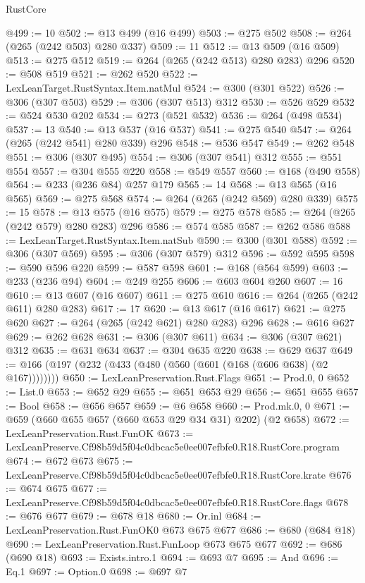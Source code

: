 \begin{lexlean}{RustCore}
\begin{coremodule}
@499 := 10
@502 := @13 @499 (@16 @499)
@503 := @275 @502
@508 := @264 (@265 (@242 @503) @280 @337)
@509 := 11
@512 := @13 @509 (@16 @509)
@513 := @275 @512
@519 := @264 (@265 (@242 @513) @280 @283) @296
@520 := @508 @519
@521 := @262 @520
@522 := LexLeanTarget.RustSyntax.Item.natMul
@524 := @300 (@301 @522)
@526 := @306 (@307 @503)
@529 := @306 (@307 @513) @312
@530 := @526 @529
@532 := @524 @530 @202
@534 := @273 (@521 @532)
@536 := @264 (@498 @534)
@537 := 13
@540 := @13 @537 (@16 @537)
@541 := @275 @540
@547 := @264 (@265 (@242 @541) @280 @339) @296
@548 := @536 @547
@549 := @262 @548
@551 := @306 (@307 @495)
@554 := @306 (@307 @541) @312
@555 := @551 @554
@557 := @304 @555 @220
@558 := @549 @557
@560 := @168 (@490 @558)
@564 := @233 (@236 @84) @257 @179
@565 := 14
@568 := @13 @565 (@16 @565)
@569 := @275 @568
@574 := @264 (@265 (@242 @569) @280 @339)
@575 := 15
@578 := @13 @575 (@16 @575)
@579 := @275 @578
@585 := @264 (@265 (@242 @579) @280 @283) @296
@586 := @574 @585
@587 := @262 @586
@588 := LexLeanTarget.RustSyntax.Item.natSub
@590 := @300 (@301 @588)
@592 := @306 (@307 @569)
@595 := @306 (@307 @579) @312
@596 := @592 @595
@598 := @590 @596 @220
@599 := @587 @598
@601 := @168 (@564 @599)
@603 := @233 (@236 @94)
@604 := @249 @255
@606 := @603 @604 @260
@607 := 16
@610 := @13 @607 (@16 @607)
@611 := @275 @610
@616 := @264 (@265 (@242 @611) @280 @283)
@617 := 17
@620 := @13 @617 (@16 @617)
@621 := @275 @620
@627 := @264 (@265 (@242 @621) @280 @283) @296
@628 := @616 @627
@629 := @262 @628
@631 := @306 (@307 @611)
@634 := @306 (@307 @621) @312
@635 := @631 @634
@637 := @304 @635 @220
@638 := @629 @637
@649 := @166 (@197 (@232 (@433 (@480 (@560 (@601 (@168 (@606 @638) (@2 @167))))))))
@650 := LexLeanPreservation.Rust.Flags
@651 := Prod.{0, 0}
@652 := List.{0}
@653 := @652 @29
@655 := @651 @653 @29
@656 := @651 @655
@657 := Bool
@658 := @656 @657
@659 := @6 @658
@660 := Prod.mk.{0, 0}
@671 := @659 (@660 @655 @657 (@660 @653 @29 @34 @31) @202) (@2 @658)
@672 := LexLeanPreservation.Rust.FunOK
@673 := LexLeanPreserve.Cf98b59d5f04c0dbcac5e0ee007efbfe0.R18.RustCore.program
@674 := @672 @673
@675 := LexLeanPreserve.Cf98b59d5f04c0dbcac5e0ee007efbfe0.R18.RustCore.krate
@676 := @674 @675
@677 := LexLeanPreserve.Cf98b59d5f04c0dbcac5e0ee007efbfe0.R18.RustCore.flags
@678 := @676 @677
@679 := @678 @18
@680 := Or.inl
@684 := LexLeanPreservation.Rust.FunOK0 @673 @675 @677
@686 := @680 (@684 @18)
@690 := LexLeanPreservation.Rust.FunLoop @673 @675 @677
@692 := @686 (@690 @18)
@693 := Exists.intro.{1}
@694 := @693 @7
@695 := And
@696 := Eq.{1}
@697 := Option.{0}
@698 := @697 @7

\end{coremodule}
\end{lexlean}
